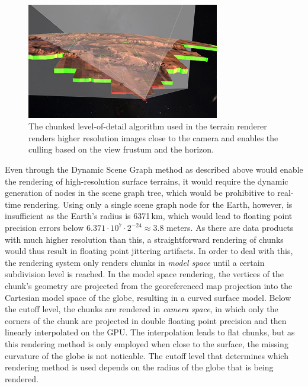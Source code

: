 \begin{figure}
\centering
\includegraphics[width=0.75\textwidth]{figures/contributions/gb/culling.png}
\caption{The chunked level-of-detail algorithm used in the terrain renderer renders higher resolution images close to the camera and enables the culling based on the view frustum and the horizon.}
\label{contributions:astro:gb:culling}
\end{figure}

Even through the Dynamic Scene Graph method as described above would enable the rendering of high-resolution surface terrains, it would require the dynamic generation of nodes in the scene graph tree, which would be prohibitive to real-time rendering.  Using only a single scene graph node for the Earth, however, is insufficient as the Earth's radius is 6371\,km, which would lead to floating point precision errors below $6.371\cdot 10^7 \cdot 2^{-24} \approx 3.8$ meters.  As there are data products with much higher resolution than this, a straightforward rendering of chunks would thus result in floating point jittering artifacts.  In order to deal with this, the rendering system only renders chunks in \emph{model space} until a certain subdivision level is reached.  In the model space rendering, the vertices of the chunk's geometry are projected from the georeferenced map projection into the Cartesian model space of the globe, resulting in a curved surface model.  Below the cutoff level, the chunks are rendered in \emph{camera space}, in which only the corners of the chunk are projected in double floating point precision and then linearly interpolated on the GPU.  The interpolation leads to flat chunks, but as this rendering method is only employed when close to the surface, the missing curvature of the globe is not noticable.  The cutoff level that determines which rendering method is used depends on the radius of the globe that is being rendered.





